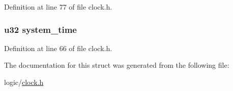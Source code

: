 \-Definition at line 77 of file clock.\-h.

\hypertarget{structtime_a6a2672b74bddd00613c7fc2b4cd92b3b}{
\subsubsection[{system\-\_\-time}]{\setlength{\rightskip}{0pt plus 5cm}u32 {\bf system\-\_\-time}}}\label{structtime_a6a2672b74bddd00613c7fc2b4cd92b3b}


\-Definition at line 66 of file clock.\-h.



\-The documentation for this struct was generated from the following file\-:\begin{DoxyCompactItemize}
\item 
logic/\hyperlink{clock_8h}{clock.\-h}\end{DoxyCompactItemize}
